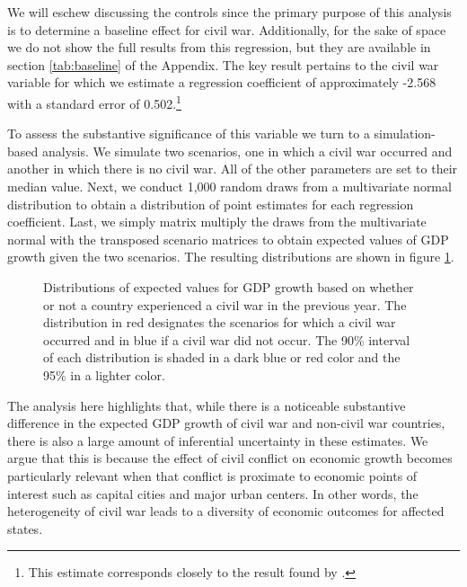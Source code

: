 
We will eschew discussing the controls since the primary purpose of this analysis is to determine a baseline effect for civil war. Additionally, for the sake of space we do not show the full results from this regression, but they are available in section \ref{tab:baseline} of the Appendix. The key result pertains to the civil war variable for which we estimate a regression coefficient of approximately -2.568 with a standard error of 0.502.\footnote{This estimate corresponds closely to the result found by \citet{collier:1999}.}

To assess the substantive significance of this variable we turn to a simulation-based analysis. We simulate two scenarios, one in which a civil war occurred and another in which there is no civil war.  All of the other parameters are set to their median value. Next, we conduct 1,000 random draws from a multivariate normal distribution to obtain a distribution of point estimates for each regression coefficient. Last, we simply matrix multiply the draws from the multivariate normal with the transposed scenario matrices to obtain expected values of GDP growth given the two scenarios. The resulting distributions are shown in figure \ref{fig:civWarEffect}. 

\begin{figure}
	\centering
	\resizebox{.45\textwidth}{!}{}
	\caption{Distributions of expected values for GDP growth based on whether or not a country experienced a civil war in the previous year. The distribution in red designates the scenarios for which a civil war occurred and in blue if a civil war did not occur. The 90\% interval of each distribution is shaded in a dark blue or red color and the 95\% in a lighter color.}
	\label{fig:civWarEffect}	
\end{figure}
\FloatBarrier

The analysis here highlights that, while there is a noticeable substantive difference in the expected GDP growth of civil war and non-civil war countries, there is also a large amount of inferential uncertainty in these estimates. We argue that this is because the effect of civil conflict on economic growth becomes particularly relevant when that conflict is proximate to economic points of interest such as capital cities and major urban centers. In other words, the heterogeneity of civil war leads to a diversity of economic outcomes for affected states.
%
